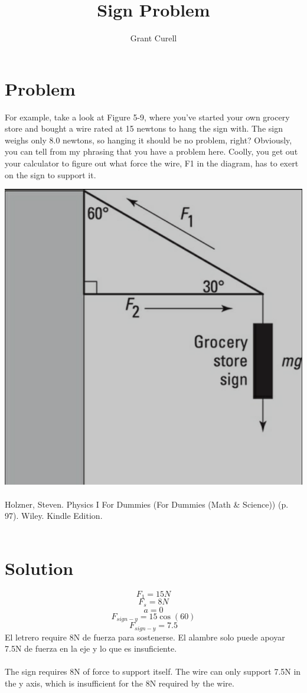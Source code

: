 \documentclass{article}
\title{Sign Problem}
\author{Grant Curell}
\begin{document}
\maketitle{}
\section{Problem}
For example, take a look at Figure 5-9, where you’ve started your own grocery store and bought a wire rated at 15 newtons to hang the sign with. The sign weighs only 8.0 newtons, so hanging it should be no problem, right? Obviously, you can tell from my phrasing that you have a problem here. Coolly, you get out your calculator to figure out what force the wire, F1 in the diagram, has to exert on the sign to support it.

\includegraphics[width=\columnwidth]{image}
\\\\
Holzner, Steven. Physics I For Dummies (For Dummies (Math \& Science)) (p. 97). Wiley. Kindle Edition.
\\\\
\section{Solution}
\[ F_1=15N \]
\[ F_s=8N \]
\[ a=0 \]
\[ F_{sign-y}=15\cos(60) \]
\[ F_{sign-y}=7.5 \]
El letrero require 8N de fuerza para sostenerse. El alambre solo puede apoyar 7.5N de fuerza en la eje y lo que es insuficiente.
\\\\
The sign requires 8N of force to support itself. The wire can only support 7.5N in the y axis, which is insufficient for the 8N required by the wire.
\end{document}
